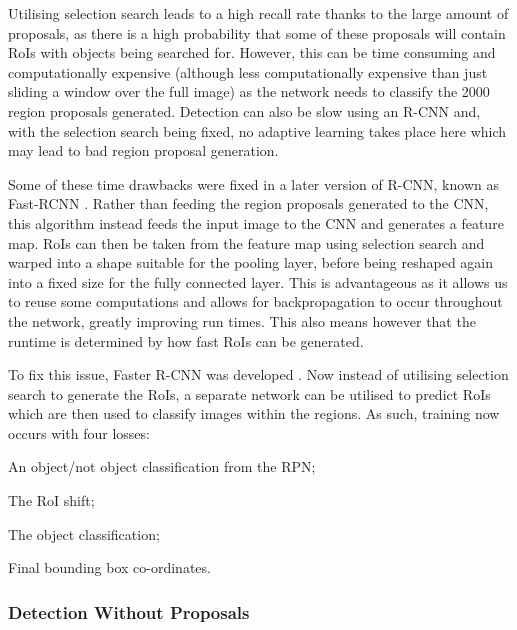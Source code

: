 Utilising selection search leads to a high recall rate thanks to the large amount of proposals, as there is a high probability that some of these proposals will contain RoIs with objects being searched for. However, this can be time consuming and computationally expensive (although less computationally expensive than just sliding a window over the full image) as the network needs to classify the 2000 region proposals generated. Detection can also be slow using an R-CNN and, with the selection search being fixed, no adaptive learning takes place here which may lead to bad region proposal generation. 

Some of these time drawbacks were fixed in a later version of R-CNN, known as Fast-RCNN \cite{girshick_fast_2015}. Rather than feeding the region proposals generated to the CNN, this algorithm instead feeds the input image to the CNN and generates a feature map. RoIs can then be taken from the feature map using selection search and warped into a shape suitable for the pooling layer, before being reshaped again into a fixed size for the fully connected layer. This is advantageous as it allows us to reuse some computations and allows for backpropagation to occur throughout the network, greatly improving run times.  This also means however that the runtime is determined by how fast RoIs can be generated. 

To fix this issue, Faster R-CNN was developed \cite{ren_faster_2015}. Now instead of utilising selection search to generate the RoIs, a separate network can be utilised to predict RoIs which are then used to classify images within the regions. As such, training now occurs with four losses: 

\begin{enumerate*}
	\item An object/not object classification from the RPN;
	\item The RoI shift;
	\item The object classification;
	\item Final bounding box co-ordinates.
\end{enumerate*}

\subsubsection{Detection Without Proposals}\label{ch:Background,sec:objectDetection,sub:noProposals}


